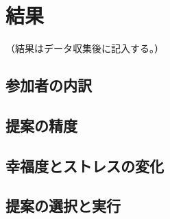 \chapter{結果}
（結果はデータ収集後に記入する。）
\section{参加者の内訳}
\section{提案の精度}
\section{幸福度とストレスの変化}
\section{提案の選択と実行}
